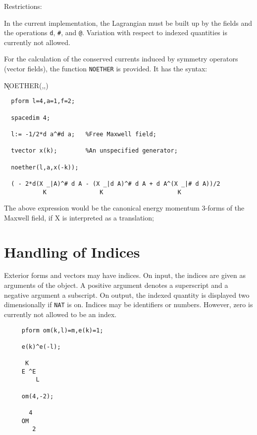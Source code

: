Restrictions:

In the current implementation, the Lagrangian must be built up by the
fields and the operations {\tt d}, {\tt \#}, and {\tt @}. Variation
with respect to indexed quantities is currently not allowed.

For the calculation of the conserved currents induced by symmetry
operators (vector fields), the function {\tt NOETHER}\label{NOETHER}
is provided.  It has the syntax:

\hspace*{2em}
\k{NOETHER}(,,)

\example{}

\begin{verbatim}
  pform l=4,a=1,f=2;

  spacedim 4;

  l:= -1/2*d a^#d a;   %Free Maxwell field;

  tvector x(k);        %An unspecified generator;

  noether(l,a,x(-k));

  ( - 2*d(X _|A)^# d A - (X _|d A)^# d A + d A^(X _|# d A))/2
           K               K                     K
\end{verbatim}

The above expression would be the canonical energy
momentum 3-forms of the Maxwell field, if X is interpreted 
as a translation;



\section{Handling of Indices}
Exterior forms and vectors may have indices.  On input, the indices
are given as arguments of the object.  A positive argument denotes a
superscript and a negative argument a subscript.  On output, the
indexed quantity is displayed two dimensionally if {\tt NAT} is on.
Indices may be identifiers or numbers.  However, zero is currently not
allowed to be an index.

\example{}

\begin{verbatim}
     pform om(k,l)=m,e(k)=1;

     e(k)^e(-l);

      K
     E ^E
         L

     om(4,-2);

       4
     OM
        2
\end{verbatim}

